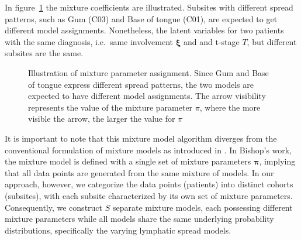 \documentclass[
  sn-mathphys-num,
]{sn-jnl}
\begin{document}
In figure~\ref{fig-model-simple} the mixture coefficients are
illustrated. Subsites with different spread patterns, such as Gum (C03)
and Base of tongue (C01), are expected to get different model
assignments. Nonetheless, the latent variables for two patients with the
same diagnosis, i.e.~same involvement \(\boldsymbol{\xi}\) and and
t-stage \(T\), but different subsites are the same.

\begin{figure}


\caption{\label{fig-model-simple}Illustration of mixture parameter
assignment. Since Gum and Base of tongue express different spread
patterns, the two models are expected to have different model
assignments. The arrow visibility represents the value of the mixture
parameter \(\pi\), where the more visible the arrow, the larger the
value for \(\pi\)}

\end{figure}%

It is important to note that this mixture model algorithm diverges from
the conventional formulation of mixture models as introduced in
\citet{bishop_pattern_2006}. In Bishop's work, the mixture model is
defined with a single set of mixture parameters \(\boldsymbol{\pi}\),
implying that all data points are generated from the same mixture of
models. In our approach, however, we categorize the data points
(patients) into distinct cohorts (subsites), with each subsite
characterized by its own set of mixture parameters. Consequently, we
construct \(S\) separate mixture models, each possessing different
mixture parameters while all models share the same underlying
probability distributions, specifically the varying lymphatic spread
models.
\end{document}
